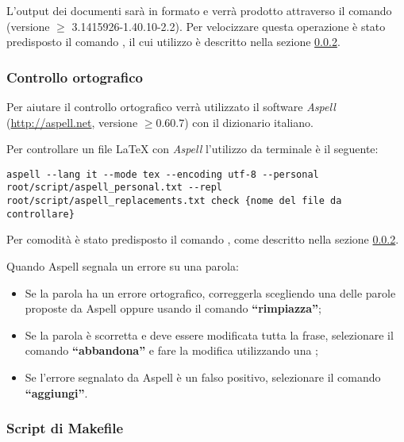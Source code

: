 		L'output dei documenti sarà in formato  e verrà prodotto attraverso il comando  (versione $\geq$ 3.1415926-1.40.10-2.2). Per velocizzare questa operazione è stato predisposto il comando , il cui utilizzo è descritto nella sezione \ref{makefile}.
		
		\subsubsection{Controllo ortografico}
		
		Per aiutare il controllo ortografico verrà utilizzato il software \emph{Aspell} (\url{http://aspell.net}, versione $\geq 0.60.7$) con il dizionario italiano.
		
		Per controllare un file \LaTeX{} con \emph{Aspell} l'utilizzo da terminale è il seguente:
\begin{lstlisting}
aspell --lang it --mode tex --encoding utf-8 --personal root/script/aspell_personal.txt --repl root/script/aspell_replacements.txt check {nome del file da controllare}
\end{lstlisting}
		
		Per comodità è stato predisposto il comando , come descritto nella sezione \ref{makefile}.
		
		Quando Aspell segnala un errore su una parola:
		\begin{itemize}
		 \item Se la parola ha un errore ortografico, correggerla scegliendo una delle parole proposte da Aspell oppure usando il comando \textbf{``rimpiazza''};
		 \item Se la parola è scorretta e deve essere modificata tutta la frase, selezionare il comando \textbf{``abbandona''} e fare la modifica utilizzando una ;
		 \item Se l'errore segnalato da Aspell è un falso positivo, selezionare il comando \textbf{``aggiungi''}.
		\end{itemize}

		\subsubsection{Script di Makefile}
		\label{makefile}

